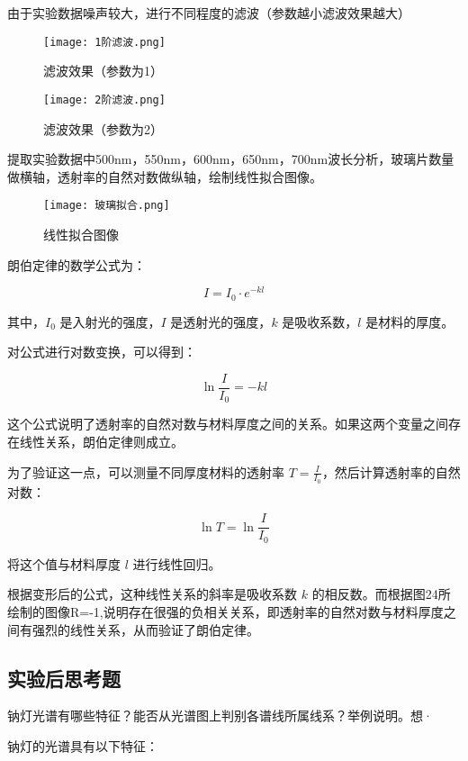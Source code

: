 \documentclass[dvipsnames, svgnames,a4paper,11pt]{article}
\begin{document}
\begin{enumerate}
				由于实验数据噪声较大，进行不同程度的滤波（参数越小滤波效果越大）
				\begin{figure}[{H}]
					\centering
					\texttt{[image: 1阶滤波.png]}
					\caption{滤波效果（参数为1）}
					\label{}
				\end{figure}
				\begin{figure}[{H}]
					\centering
					\texttt{[image: 2阶滤波.png]}
					\caption{滤波效果（参数为2）}
					\label{}
				\end{figure}
				提取实验数据中500nm，550nm，600nm，650nm，700nm波长分析，玻璃片数量做横轴，透射率的自然对数做纵轴，绘制线性拟合图像。
			\begin{figure}[{H}]
				\centering
				\texttt{[image: 玻璃拟合.png]}
				\caption{线性拟合图像}
				\label{}
			\end{figure}
			朗伯定律的数学公式为：

\[ I = I_0 \cdot e^{-kl} \]

其中，\( I_0 \) 是入射光的强度，\( I \) 是透射光的强度，\( k \) 是吸收系数，\( l \) 是材料的厚度。

对公式进行对数变换，可以得到：

\[ \ln \frac{I}{I_0} = -kl \]

这个公式说明了透射率的自然对数与材料厚度之间的关系。如果这两个变量之间存在线性关系，朗伯定律则成立。

为了验证这一点，可以测量不同厚度材料的透射率 \( T = \frac{I}{I_0} \)，然后计算透射率的自然对数：

\[ \ln T = \ln \frac{I}{I_0} \]

将这个值与材料厚度 \( l \) 进行线性回归。

根据变形后的公式，这种线性关系的斜率是吸收系数 \( k \) 的相反数。而根据图24所绘制的图像R=-1,说明存在很强的负相关关系，即透射率的自然对数与材料厚度之间有强烈的线性关系，从而验证了朗伯定律。










	\end{enumerate}
	
	
	\subsection{实验后思考题}
	
	\begin{question}
		钠灯光谱有哪些特征？能否从光谱图上判别各谱线所属线系？举例说明。想·
	\end{question}
	钠灯的光谱具有以下特征：
\end{document}

